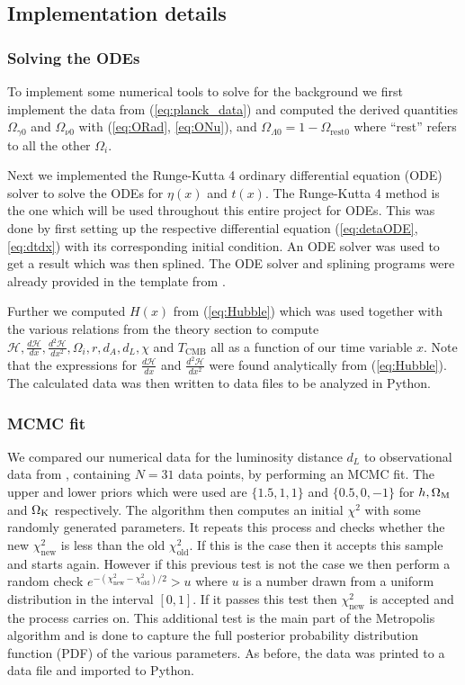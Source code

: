 \documentclass[%
reprint,
 amsmath,amssymb,
 aps,
]{revtex4-2}
\newcommand{\Hp}{\mathcal{H}}
\begin{document}
\subsection{Implementation details}
\subsubsection{Solving the ODEs}
To implement some numerical tools to solve for the background we first implement the data from (\ref{eq:planck_data}) and computed the derived quantities $\Omega_{\gamma0}$ and $\Omega_{\nu0}$ with (\ref{eq:ORad}, \ref{eq:ONu}), and $\Omega_{\Lambda0}=1-\Omega_\text{rest0}$ where ``rest'' refers to all the other $\Omega_i$.  

Next we implemented the Runge-Kutta 4 ordinary differential equation (ODE) solver to solve the ODEs for $\eta(x)$ and $t(x)$. The Runge-Kutta 4 method is the one which will be used throughout this entire project for ODEs. This was done by first setting up the respective differential equation (\ref{eq:detaODE}, \ref{eq:dtdx}) with its corresponding initial condition. An ODE solver was used to get a result which was then splined. The ODE solver and splining programs were already provided in the template from \cite{AST5220LectureNotes}. 

Further we computed $H(x)$ from (\ref{eq:Hubble}) which was used together with the various relations from the theory section to compute $\Hp,\frac{d\Hp}{dx},\frac{d^2\Hp}{dx^2},\Omega_i,r,d_A,d_L,\chi$ and $T_{\text{CMB}}$ all as a function of our time variable $x$. Note that the expressions for $\frac{d\Hp}{dx}$ and $\frac{d^2\Hp}{dx^2}$ were found analytically from (\ref{eq:Hubble}). The calculated data was then written to data files to be analyzed in Python.
\subsubsection{MCMC fit}
We compared our numerical data  for the luminosity distance $d_L$ to observational data from \cite{SDSS:2014iwm}, containing $N=31$ data points, by performing an MCMC fit. The upper and lower priors which were used are $\{1.5,1,1\}$ and $\{0.5,0,-1\}$ for $h, \Omega_{\text M}$ and $\Omega_{\text K}$ respectively. The algorithm then computes an initial $\chi^2$ with some randomly generated parameters. It repeats this process and checks whether the new $\chi^2_\text{new}$ is less than the old $\chi^2_\text{old}$. If this is the case then it accepts this sample and starts again. However if this previous test is not the case we then perform a random check $e^{-(\chi^2_\text{new}-\chi_\text{old}^2)/2}>u$ where $u$ is a number drawn from a uniform distribution in the interval $[0,1]$. If it passes this test then $\chi^2_\text{new}$ is accepted and the process carries on. This additional test is the main part of the Metropolis algorithm and is done to capture the full posterior probability distribution function (PDF) of the various parameters.  As before, the data was printed to a data file and imported to Python.
\end{document}
